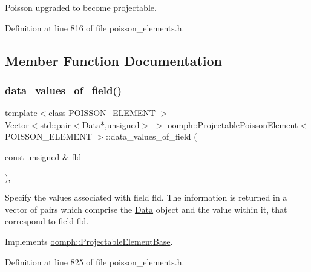 Poisson upgraded to become projectable. 

Definition at line 816 of file poisson\+\_\+elements.\+h.



\subsection{Member Function Documentation}
\mbox{\label{classoomph_1_1ProjectablePoissonElement_a9ee630c0affbb44077365bc9309ce1a1}} 
\subsubsection{\texorpdfstring{data\+\_\+values\+\_\+of\+\_\+field()}{data\_values\_of\_field()}}
{\footnotesize\ttfamily template$<$class P\+O\+I\+S\+S\+O\+N\+\_\+\+E\+L\+E\+M\+E\+NT $>$ \\
\hyperlink{classoomph_1_1Vector}{Vector}$<$std\+::pair$<$\hyperlink{classoomph_1_1Data}{Data}$\ast$,unsigned$>$ $>$ \hyperlink{classoomph_1_1ProjectablePoissonElement}{oomph\+::\+Projectable\+Poisson\+Element}$<$ P\+O\+I\+S\+S\+O\+N\+\_\+\+E\+L\+E\+M\+E\+NT $>$\+::data\+\_\+values\+\_\+of\+\_\+field (\begin{DoxyParamCaption}\item[{const unsigned \&}]{fld }\end{DoxyParamCaption})\hspace{0.3cm}{\ttfamily [inline]}, {\ttfamily [virtual]}}



Specify the values associated with field fld. The information is returned in a vector of pairs which comprise the \hyperlink{classoomph_1_1Data}{Data} object and the value within it, that correspond to field fld. 



Implements \hyperlink{classoomph_1_1ProjectableElementBase_a644306ebdf16f334344c2d27d72f18b7}{oomph\+::\+Projectable\+Element\+Base}.



Definition at line 825 of file poisson\+\_\+elements.\+h.




